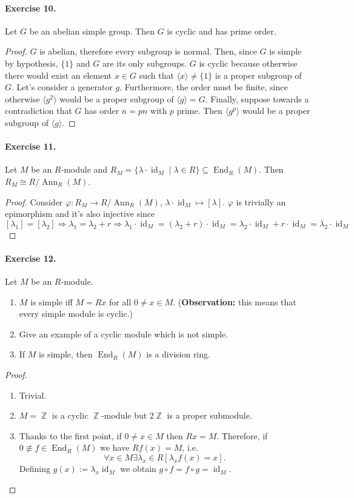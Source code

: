 \documentclass[12pt,a4paper]{report}
\theoremstyle{definition}
\theoremstyle{num.custom-title}
\DeclareMathOperator{\id}{id}
\DeclareMathOperator{\End}{End}
\DeclareMathOperator{\Ann}{Ann}
\DeclareMathOperator{\Z}{\mathbb{Z}}
\DeclareMathOperator{\imp}{\Rightarrow}
\DeclareMathOperator{\sse}{\subseteq}
\renewcommand{\phi}{\varphi}
\begin{document}
\paragraph{Exercise 10.} Let $G$ be an abelian simple group. Then $G$ is cyclic and has prime order.
\begin{proof}
$G$ is abelian, therefore every subgroup is normal. Then, since $G$ is simple by hypothesis, $\{1\}$ and $G$ are its only subgroups. $G$ is cyclic because otherwise there would exist an element $x \in G$ such that $\langle x \rangle \ne \{1\}$ is a proper subgroup of $G$. Let's consider a generator $g$. Furthermore, the order must be finite, since otherwise $\langle g^2 \rangle$ would be a proper subgroup of $\langle g \rangle = G$. Finally, suppose towards a contradiction that $G$ has order $n=p n$ with $p$ prime. Then $\langle g^p \rangle$ would be a proper subgroup of $\langle g \rangle$.
\end{proof}

\paragraph{Exercise 11.} Let $M$ be an $R$-module and $R_M=\{\lambda \cdot \id_M \mid \lambda \in R\} \sse \End_R(M)$. Then $R_M \cong R/\Ann_R(M)$.
\begin{proof}
Consider $\phi : R_M \to R/\Ann_R(M)$, $\lambda \cdot \id_M \mapsto [\lambda]$. $\phi$ is trivially an epimorphism and it's also injective since 
\[
[\lambda_1]=[\lambda_2] \imp \lambda_1=\lambda_2+r \imp \lambda_1 \cdot \id_M = (\lambda_2+r) \cdot \id_M = \lambda_2 \cdot \id_M + r \cdot \id_M = \lambda_2 \cdot \id_M
\]
\end{proof}

\paragraph{Exercise 12.} Let $M$ be an $R$-module.
\begin{enumerate}
\item $M$ is simple iff $M=Rx$ for all $0 \ne x \in M$. (\textbf{Observation:} this means that every simple module is cyclic.)
\item Give an example of a cyclic module which is not simple.
\item If $M$ is simple, then $\End_R(M)$ is a division ring.
\end{enumerate}
\begin{proof}\
\begin{enumerate}
\item Trivial.
\item $M=\Z$ is a cyclic $\Z$-module but $2\Z$ is a proper submodule.
\item Thanks to the first point, if $0 \ne x \in M$ then $Rx=M$. Therefore, if $0 \not\equiv f \in \End_R(M)$ we have $Rf(x)=M$, i.e. 
\[
\forall x \in M \exists \lambda_x \in R [\lambda_x f(x) = x].
\]
Defining $g(x):=\lambda_x \id_M$ we obtain $g \circ f = f \circ g = \id_M$.
\end{enumerate}
\end{proof}
\end{document}
